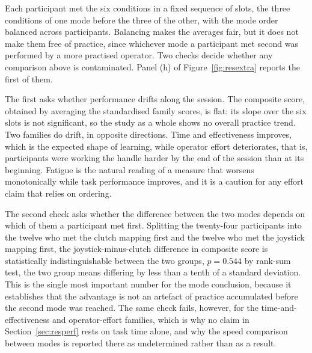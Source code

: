 \documentclass[12pt,a4paper,twoside,openright]{report}
\begin{document}
Each participant met the six conditions in a fixed sequence of slots, the three conditions of one mode before the three of the other, with the mode order balanced across participants. Balancing makes the averages fair, but it does not make them free of practice, since whichever mode a participant met second was performed by a more practised operator. Two checks decide whether any comparison above is contaminated. Panel (h) of Figure~\ref{fig:resextra} reports the first of them.

The first asks whether performance drifts along the session. The composite score, obtained by averaging the standardised family scores, is flat: its slope over the six slots is not significant, so the study as a whole shows no overall practice trend. Two families do drift, in opposite directions. Time and effectiveness improves, which is the expected shape of learning, while operator effort deteriorates, that is, participants were working the handle harder by the end of the session than at its beginning. Fatigue is the natural reading of a measure that worsens monotonically while task performance improves, and it is a caution for any effort claim that relies on ordering.

The second check asks whether the difference between the two modes depends on which of them a participant met first. Splitting the twenty-four participants into the twelve who met the clutch mapping first and the twelve who met the joystick mapping first, the joystick-minus-clutch difference in composite score is statistically indistinguishable between the two groups, $p = 0.544$ by rank-sum test, the two group means differing by less than a tenth of a standard deviation. This is the single most important number for the mode conclusion, because it establishes that the advantage is not an artefact of practice accumulated before the second mode was reached. The same check fails, however, for the time-and-effectiveness and operator-effort families, which is why no claim in Section~\ref{sec:resperf} rests on task time alone, and why the speed comparison between modes is reported there as undetermined rather than as a result.
\end{document}

